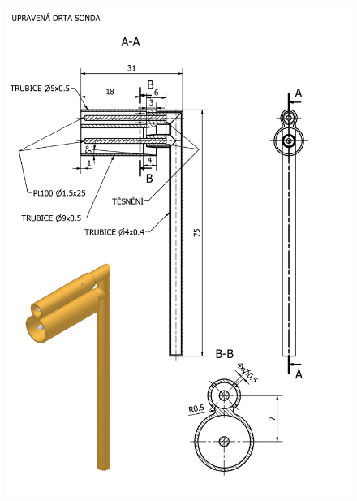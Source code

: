     \begin{figure}[ht!]
        \centering
        \includegraphics[width=\textwidth]{500_FINAL/sonda_final_vykres.png}
    \end{figure}